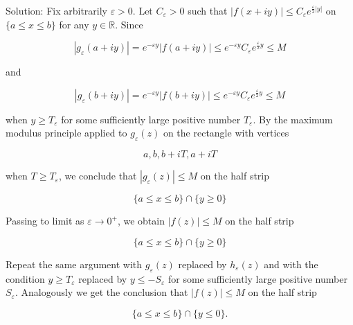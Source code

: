 \documentclass[10pt]{article}
\begin{document}
Solution: Fix arbitrarily $\varepsilon>0$. Let $C_{\varepsilon}>0$ such that $|f(x+i y)| \leq C_{\varepsilon} e^{\frac{\varepsilon}{2}|y|}$ on $\{a \leq x \leq b\}$ for any $y \in \mathbb{R}$. Since

$$
\left|g_{\varepsilon}(a+i y)\right|=e^{-\varepsilon y}|f(a+i y)| \leq e^{-\varepsilon y} C_{\varepsilon} e^{\frac{\varepsilon}{2} y} \leq M
$$

and

$$
\left|g_{\varepsilon}(b+i y)\right|=e^{-\varepsilon y}|f(b+i y)| \leq e^{-\varepsilon y} C_{\varepsilon} e^{\frac{\varepsilon}{2} y} \leq M
$$

when $y \geq T_{\varepsilon}$ for some sufficiently large positive number $T_{\varepsilon}$. By the maximum modulus principle applied to $g_{\varepsilon}(z)$ on the rectangle with vertices

$$
a, b, b+i T, a+i T
$$

when $T \geq T_{\varepsilon}$, we conclude that $\left|g_{\varepsilon}(z)\right| \leq M$ on the half strip

$$
\{a \leq x \leq b\} \cap\{y \geq 0\}
$$

Passing to limit as $\varepsilon \rightarrow 0^{+}$, we obtain $|f(z)| \leq M$ on the half strip

$$
\{a \leq x \leq b\} \cap\{y \geq 0\}
$$

Repeat the same argument with $g_{\varepsilon}(z)$ replaced by $h_{\varepsilon}(z)$ and with the condition $y \geq T_{\varepsilon}$ replaced by $y \leq-S_{\varepsilon}$ for some sufficiently large positive number $S_{\varepsilon}$. Analogously we get the conclusion that $|f(z)| \leq M$ on the half strip

$$
\{a \leq x \leq b\} \cap\{y \leq 0\} .
$$
\end{document}
